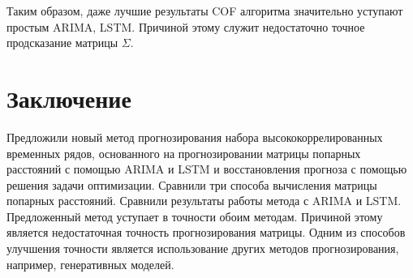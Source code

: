 \documentclass{article}
\begin{document}
Таким образом, даже лучшие результаты COF алгоритма значительно уступают простым ARIMA, LSTM. Причиной этому служит недостаточно точное продсказание матрицы $\Sigma$.

\section{Заключение}

Предложили новый метод прогнозирования набора высококоррелированных временных рядов, основанного на прогнозировании матрицы попарных расстояний с помощью ARIMA и LSTM и восстановления прогноза с помощью решения задачи оптимизации. Сравнили три способа вычисления матрицы попарных расстояний. Сравнили результаты работы метода с ARIMA и LSTM. Предложенный метод уступает в точности обоим методам. Причиной этому является недостаточная точность прогнозирования матрицы. Одним из способов улучшения точности является использование других методов прогнозирования, например, генеративных моделей. 



\end{document}

